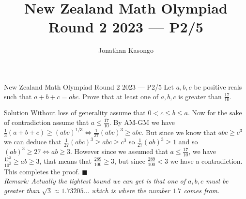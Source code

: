 \documentclass{article}
\author{Jonathan Kasongo}
\title{New Zealand Math Olympiad Round 2 2023 --- P2/5}
\begin{document}
\maketitle

\begin{problem}{New Zealand Math Olympiad Round 2 2023 --- P2/5}
Let $a,b,c$ be positive reals such that $a + b + c = abc$. Prove that at
least one of $a,b,c$ is greater than $\frac{17}{10}$.
\end{problem}

\begin{solution}{Solution}
Without loss of generality assume that $0 < c \leq b \leq a$. Now for the
sake of contradiction assume that $a \leq \frac{17}{10}$. By AM-GM we have
$\frac{1}{3}(a + b + c) \geq (abc)^{1/3} \iff \frac{1}{27}(abc)^3 \geq abc$.
But since we know that $abc \geq c^3$ we can deduce that
$\frac{1}{27}(abc)^3 \geq abc \geq c^3$ so $\frac{1}{27} (ab)^3 \geq 1$ and so
$(ab)^3 \geq 27 \iff ab \geq 3$. However since we assumed that
$a \leq \frac{17}{10}$, we have $\frac{17^2}{10^2} \geq ab \geq 3$,
that means that $\frac{289}{100} \geq 3$, but since
$\frac{289}{100} < 3$ we have a
contradiction. This completes the proof. $\blacksquare$ \\


\textit{Remark: Actually the tightest bound we can get is that one of
$a,b,c$ must be greater than $\sqrt{3} \approx 1.73205...$ which is where
the number $1.7$ comes from.}
\end{solution}
\end{document}
